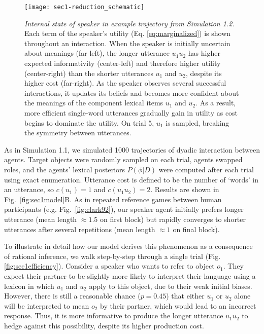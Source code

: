 

\begin{figure*}[t]
\centering
    \texttt{[image: sec1-reduction\_schematic]}
    \vspace{1em}
  \caption{\emph{Internal state of speaker in example trajectory from Simulation 1.2.} Each term of the speaker's utility (Eq. \ref{eq:marginalized}) is shown throughout an interaction. When the speaker is initially uncertain about meanings (far left), the longer utterance $u_1u_2$ has higher expected informativity (center-left) and therefore higher utility (center-right) than the shorter utterances $u_1$ and $u_2$, despite its higher cost (far-right). As the speaker observes several successful interactions, it updates its beliefs and becomes more confident about the meanings of the component lexical items $u_1$ and $u_2$. As a result, more efficient single-word utterances gradually gain in utility as cost begins to dominate the utility. On trial 5, $u_1$ is sampled, breaking the symmetry between utterances.}
  \label{fig:sec1internals}
\end{figure*}

As in Simulation 1.1, we simulated 1000 trajectories of dyadic interaction between agents.
Target objects were randomly sampled on each trial, agents swapped roles, and the agents' lexical posteriors $P(\phi | D)$ were computed after each trial using exact enumeration. 
Utterance cost is defined to be the number of `words' in an utterance, so $c(u_1) =1$ and $c(u_1u_2)=2$.
Results are shown in Fig.~\ref{fig:sec1model}B.
As in repeated reference games between human participants (e.g. Fig.~\ref{fig:clark92}), our speaker agent initially prefers longer utterance (mean length $\approx 1.5$ on first block) but rapidly converges to shorter utterances after several repetitions (mean length $\approx 1$ on final block).

To illustrate in detail how our model derives this phenomenon as a consequence of rational inference, we walk step-by-step through a single trial (Fig. \ref{fig:sec1efficiency}).
Consider a speaker who wants to refer to object $o_1$. 
They expect their partner to be slightly more likely to interpret their language using a lexicon in which $u_{1}$ and $u_{2}$ apply to this object, due to their weak initial biases. 
However, there is still a reasonable chance ($p=0.45$) that either $u_1$ or $u_2$ alone will be interpreted to mean $o_2$ by their partner, which would lead to an incorrect response. 
Thus, it is more informative to produce the longer utterance $u_{1}u_{2}$ to hedge against this possibility, despite its higher production cost. 

